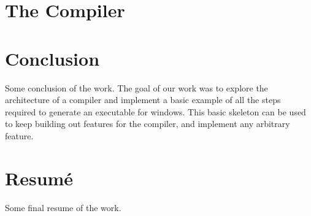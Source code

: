 \documentclass[a4paper,oneside,onecolumn,12pt]{LegrandOrangeBook}
\begin{document}
\chapter{The Compiler}

\chapter*{Conclusion}
Some conclusion of the work.
The goal of our work was to explore the architecture of a compiler and implement a basic example of all the steps required to generate an executable for windows. This basic skeleton can be used to keep building out features for the compiler, and implement any arbitrary feature.

\pagebreak

\chapter*{Resumé}
Some final resume of the work.


\begin{appendices}
\end{appendices}
\end{document}
